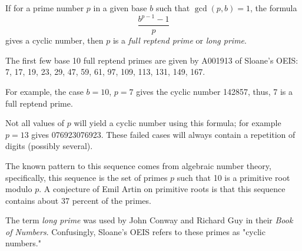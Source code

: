 \documentclass[12pt]{article}
\begin{document}
If for a prime number $p$ in a given base $b$ such that $\gcd(p, b) = 1$, the formula $$\frac{b^{p - 1} - 1}{p}$$ gives a cyclic number, then $p$ is a {\em full reptend prime} or {\em long prime}.

The first few base 10 full reptend primes are given by A001913 of Sloane's OEIS: 7, 17, 19, 23, 29, 47, 59, 61, 97, 109, 113, 131, 149, 167.

For example, the case $b = 10$, $p = 7$ gives the cyclic number 142857, thus, 7 is a full reptend prime.

Not all values of $p$ will yield a cyclic number using this formula; for example $p = 13$ gives 076923076923. These failed cases will always contain a repetition of digits (possibly several).

The known pattern to this sequence comes from algebraic number theory, specifically, this sequence is the set of primes $p$ such that 10 is a primitive root modulo $p$. A conjecture of Emil Artin on primitive roots is that this sequence contains about 37 percent of the primes.

The term {\em long prime} was used by John Conway and Richard Guy in their {\it Book of Numbers}. Confusingly, Sloane's OEIS refers to these primes as "cyclic numbers."
\end{document}
